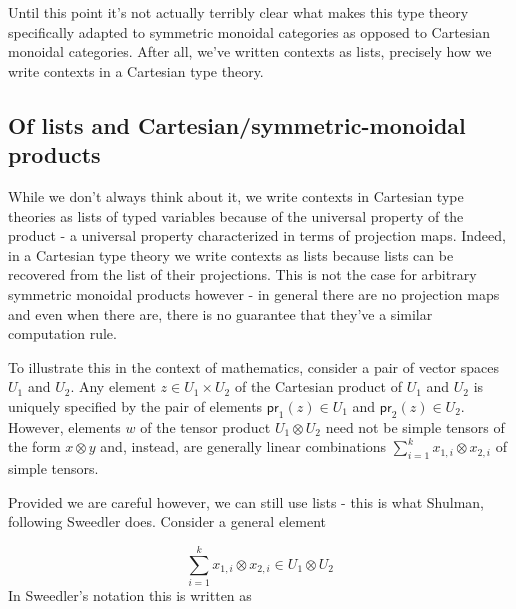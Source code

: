 \documentclass[pra,floatfix,
amsmath,superscriptaddress, 12pt]{article}
\theoremstyle{definition}
\newcommand{\msf}[1]{\mathsf{#1}}
\begin{document}
Until this point it's not actually terribly clear what makes this type theory specifically adapted to symmetric monoidal categories as opposed to Cartesian monoidal categories. After all, we've written contexts as lists, precisely how we write contexts in a Cartesian type theory. 

\subsection{Of lists and Cartesian/symmetric-monoidal products}

While we don't always think about it, we write contexts in Cartesian type theories as lists of typed variables because of the universal property of the product - a universal property characterized in terms of projection maps. Indeed, in a Cartesian type theory we write contexts as lists because lists can be recovered from the list of their projections. This is not the case for arbitrary symmetric monoidal products however - in general there are no projection maps and even when there are, there is no guarantee that they've a similar computation rule.



To illustrate this in the context of mathematics, consider a pair of vector spaces $U_1$ and $U_2$. Any element $z\in U_1 \times U_2$ of the Cartesian product of $U_1$ and $U_2$ is uniquely specified by the pair of elements $\mathsf{pr}_{1}(z) \in U_1$ and $\msf{pr}_{2}(z)\in U_2$. However, elements $w$ of the tensor product $U_1 \otimes U_2$ need not be simple tensors of the form $x \otimes y$ and, instead, are generally linear combinations $\sum_{i=1}^{k}x_{1,i} \otimes x_{2,i}$ of simple tensors.

Provided we are careful however, we can still use lists - this is what Shulman, following Sweedler does. Consider a general element

    \[
        \sum_{i=1}^{k}x_{1,i}\otimes x_{2,i} \in U_1 \otimes U_2
    \]
In Sweedler's notation this is written as
\end{document}
